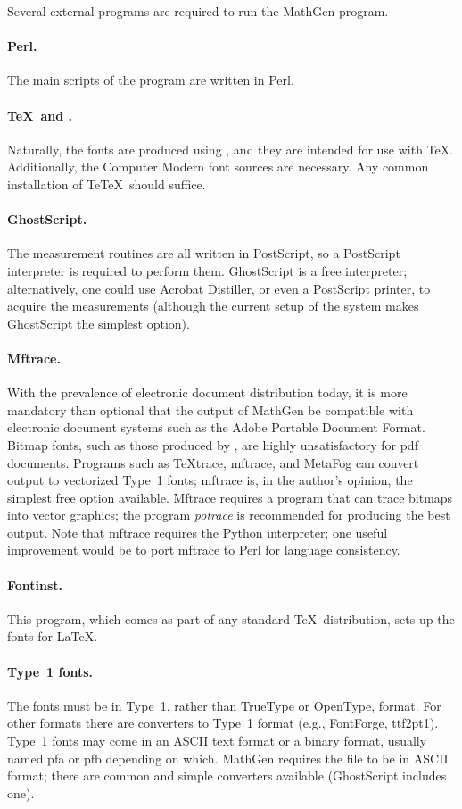 
Several external programs are required to run the MathGen program.

\paragraph{Perl.} The main scripts of the program are written in Perl.

\paragraph{\TeX\ and \MF.} Naturally, the fonts are produced using \MF, and they are intended for use with \TeX. Additionally, the Computer Modern font sources are necessary. Any common installation of Te\TeX\ should suffice.

\paragraph{GhostScript.} The measurement routines are all written in
PostScript, so a PostScript interpreter is required to perform them.
GhostScript is a free interpreter; alternatively, one could use Acrobat
Distiller, or even a PostScript printer, to acquire the measurements (although
the current setup of the system makes GhostScript the simplest option).

\paragraph{Mftrace.} With the prevalence of electronic document distribution
today, it is more mandatory than optional that the output of MathGen be
compatible with electronic document systems such as the Adobe Portable Document
Format. Bitmap fonts, such as those produced by \MF, are highly unsatisfactory
for \ac{pdf} documents. Programs such as \TeX trace, mftrace, and MetaFog can
convert \MF output to vectorized Type~1 fonts; mftrace is, in the author's
opinion, the simplest free option available. Mftrace requires a program that
can trace bitmaps into vector graphics; the program \emph{potrace} is
recommended for producing the best output. Note that mftrace requires the Python
interpreter; one useful improvement would be to port mftrace to Perl for
language consistency.

\paragraph{Fontinst.} This program, which comes as part of any standard \TeX\
distribution, sets up the fonts for \LaTeX.

\paragraph{Type~1 fonts.} The fonts must be in Type~1, rather than TrueType or
OpenType, format. For other formats there are converters to Type~1 format (e.g.,
FontForge, ttf2pt1). Type~1 fonts may come in an \ac{ASCII} text format or a
binary format, usually named \ac{pfa} or \ac{pfb} depending on which. MathGen
requires the file to be in \ac{ASCII} format; there are common and simple
converters available (GhostScript includes one).
